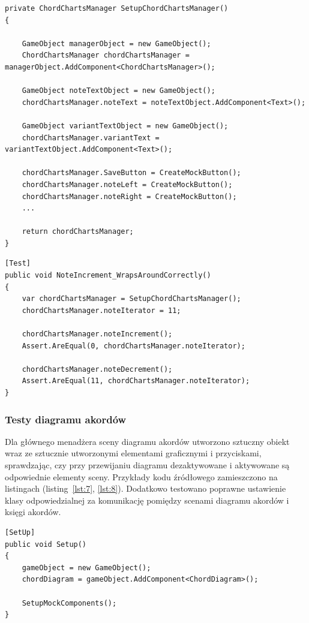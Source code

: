 \begin{lstlisting}[style=sharpcstyle,caption=Funkcja \texttt{SetupChordChartsManager}, label=lst:5]
private ChordChartsManager SetupChordChartsManager()
{

    GameObject managerObject = new GameObject();
    ChordChartsManager chordChartsManager = managerObject.AddComponent<ChordChartsManager>();

    GameObject noteTextObject = new GameObject();
    chordChartsManager.noteText = noteTextObject.AddComponent<Text>();

    GameObject variantTextObject = new GameObject();
    chordChartsManager.variantText = variantTextObject.AddComponent<Text>();

    chordChartsManager.SaveButton = CreateMockButton();
    chordChartsManager.noteLeft = CreateMockButton();
    chordChartsManager.noteRight = CreateMockButton();
    ...

    return chordChartsManager;
}
\end{lstlisting}


\begin{lstlisting}[style=sharpcstyle,caption=Funkcja \texttt{NoteIncrement\_WrapsAroundCorrectly}, label=lst:6]
[Test]
public void NoteIncrement_WrapsAroundCorrectly()
{
    var chordChartsManager = SetupChordChartsManager();
    chordChartsManager.noteIterator = 11;

    chordChartsManager.noteIncrement();
    Assert.AreEqual(0, chordChartsManager.noteIterator);

    chordChartsManager.noteDecrement();
    Assert.AreEqual(11, chordChartsManager.noteIterator);
}
\end{lstlisting}

\subsubsection{Testy diagramu akordów}

Dla głównego menadżera sceny diagramu akordów utworzono sztuczny obiekt wraz ze sztucznie utworzonymi elementami graficznymi i przyciskami, sprawdzając, czy przy przewijaniu diagramu dezaktywowane i aktywowane są odpowiednie elementy sceny. Przykłady kodu źródłowego zamieszczono na listingach (listing~\ref{lst:7}, \ref{lst:8}). Dodatkowo testowano poprawne ustawienie klasy odpowiedzialnej za komunikację pomiędzy scenami diagramu akordów i księgi akordów.

\begin{lstlisting}[style=sharpcstyle,caption=Funkcja \texttt{Setup}, label=lst:7]
[SetUp]
public void Setup()
{
    gameObject = new GameObject();
    chordDiagram = gameObject.AddComponent<ChordDiagram>();

    SetupMockComponents();
}
\end{lstlisting}

